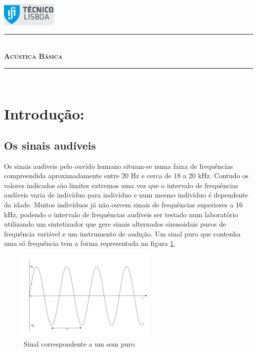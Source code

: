 \documentclass[a4paper,12pt]{article}      %
\author{Prof. Bernardo B. Carvalho}
\date{ Setembro 2012}
\newcommand{\HRule}{\rule{\linewidth}{0.5mm}}
\begin{document}
 

	\begin{center}
	\end{center}
	\includegraphics[width=0.2\textwidth]{../logo-ist}%
	
	\HRule \\[0.5cm]
	{ \huge   \bfseries \textsc{ Acústica Básica} }\\[0.4cm]
	\HRule \\%
	

\section{\sf  Introdução:} 

\subsection{\sf Os sinais audíveis}
Os sinais audíveis pelo ouvido humano situam-se numa faixa de frequências compreendida aproximadamente entre 20 Hz e cerca de 18 a 20 kHz. Contudo os valores indicados são limites extremos uma vez que o intervalo de frequências audíveis varia de indivíduo para indivíduo e num mesmo indivíduo é dependente da idade. Muitos indivíduos já não ouvem sinais de frequências superiores a 16 kHz, podendo o intervalo de frequências audíveis ser testado num laboratório utilizando um sintetizador que gere sinais alternados sinusoidais puros de frequência variável e um instrumento de audição. Um sinal puro que contenha uma só frequência tem a forma representada na figura \ref{fig:1}. 

\begin{figure}
	[bp] \centering 
	\includegraphics[width=0.6\textwidth]{sinus} \caption{Sinal correspondente a um som puro\label{fig:1} } 
\end{figure}
\end{document}
